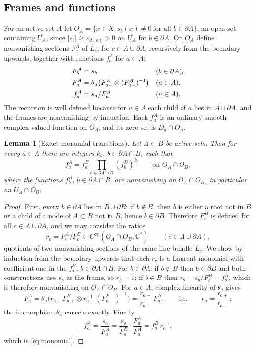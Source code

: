 \documentclass[11pt]{article}
\newtheorem{lemma}[theorem]{Lemma}
\theoremstyle{remark}
\newcommand{\C}{\mathbb C}
\newcommand{\eps}{\varepsilon}
\begin{document}
\subsection*{Frames and functions}
For an active set $A$ let
$O_A=\{x\in X: s_b(x)\ne0\ \text{for all }b\in\partial A\}$, an open
set containing $\overline{U_A}$, since $|s_b|\ge\eps_{d(b)}>0$ on
$\overline{U_A}$ for $b\in\partial A$. On $O_A$ define nonvanishing
sections $F^A_c$ of $L_c$, for $c\in A\cup\partial A$, recursively from
the boundary upwards, together with functions $f^A_a$ for $a\in A$:
\begin{align}
 F^A_b&=s_b &&(b\in\partial A),\label{eq:frames}\\
 F^A_a&=\theta_a\bigl(F^A_{a+}\otimes(F^A_{a-})^{-1}\bigr) &&(a\in A),\notag\\
 f^A_a&=s_a/F^A_a &&(a\in A).\label{eq:functions}
\end{align}
The recursion is well defined because for $a\in A$ each child of $a$
lies in $A\cup\partial A$, and the frames are nonvanishing by
induction. Each $f^A_a$ is an ordinary smooth complex-valued function
on $O_A$, and its zero set is $D_a\cap O_A$.

\begin{lemma}[Exact monomial transitions]\label{lem:monomial}
Let $A\subset B$ be active sets. Then for every $a\in A$ there are
integers $k_b$, $b\in\partial A\cap B$, such that
\begin{equation}\label{eq:monomial}
 f^A_a=f^B_a\prod_{b\in\partial A\cap B}(f^B_b)^{k_b}
 \qquad\text{on }O_A\cap O_B,
\end{equation}
where the functions $f^B_b$, $b\in\partial A\cap B$, are nonvanishing
on $O_A\cap O_B$, in particular on $U_A\cap O_B$.
\end{lemma}

\begin{proof}
First, every $b\in\partial A$ lies in $B\cup\partial B$: if $b\notin B$,
then $b$ is either a root not in $B$ or a child of a node of
$A\subset B$ not in $B$, hence $b\in\partial B$. Therefore $F^B_c$ is
defined for all $c\in A\cup\partial A$, and we may consider the ratios
\[
 r_c=F^A_c/F^B_c\in C^\infty(O_A\cap O_B,\C^*)
\qquad(c\in A\cup\partial A),
\]
quotients of two nonvanishing sections of the same line bundle $L_c$.
We show by induction from the boundary upwards that each $r_c$ is a
Laurent monomial with coefficient one in the $f^B_b$, $b\in\partial A\cap B$.
For $b\in\partial A$: if $b\notin B$ then $b\in\partial B$ and both
constructions use $s_b$ as the frame, so $r_b=1$; if $b\in B$ then
$r_b=s_b/F^B_b=f^B_b$, which is therefore nonvanishing on
$O_A\cap O_B$. For $a\in A$, complex linearity of $\theta_a$ gives
\[
 F^A_a=\theta_a\bigl(r_{a+}F^B_{a+}\otimes r_{a-}^{-1}(F^B_{a-})^{-1}\bigr)
 =\frac{r_{a+}}{r_{a-}}\,F^B_a,
 \qquad\text{i.e.}\qquad r_a=\frac{r_{a+}}{r_{a-}} ;
\]
the isomorphism $\theta_a$ cancels exactly. Finally
\[
 f^A_a=\frac{s_a}{F^A_a}=\frac{s_a}{F^B_a}\cdot\frac{F^B_a}{F^A_a}
 =f^B_a\,r_a^{-1},
\]
which is \eqref{eq:monomial}.
\end{proof}
\end{document}
